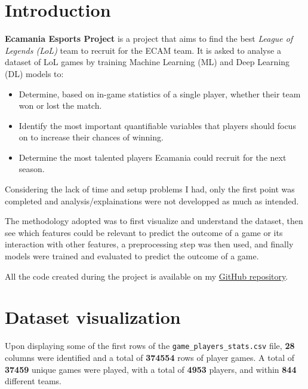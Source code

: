 \documentclass[12pt, a4paper]{article}
\begin{document}


\section{Introduction}
\textbf{Ecamania Esports Project} is a project that aims to find the best \emph{League of Legends (LoL)} team to recruit for the ECAM team.
It is asked to analyse a dataset of LoL games by training Machine Learning (ML) and Deep Learning (DL) models to:
\begin{itemize}
    \item Determine, based on in-game statistics of a single player, whether their team won or lost the match.
    \item Identify the most important quantifiable variables that players should focus on to increase their chances of winning.
    \item Determine the most talented players Ecamania could recruit for the next season.
\end{itemize}

Considering the lack of time and setup problems I had, only the first point was completed and analysis/explainations were not developped as much as intended.

The methodology adopted was to first visualize and understand the dataset, then see which features could be relevant to predict the outcome of a game or its interaction with other features, a preprocessing step was then used, and finally models were trained and evaluated to predict the outcome of a game.

All the code created during the project is available on my \href{https://github.com/NJurquet/neuralol}{GitHub repository}.

\section{Dataset visualization}
Upon displaying some of the first rows of the \texttt{game\_players\_stats.csv} file, \textbf{28} columns were identified and a total of \textbf{374554} rows of player games.
A total of \textbf{37459} unique games were played, with a total of \textbf{4953} players, and within \textbf{844} different teams.
\end{document}
